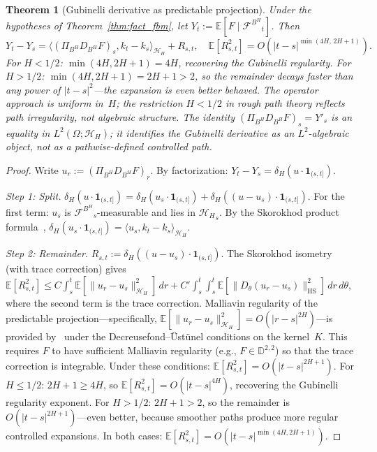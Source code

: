\documentclass[11pt,a4paper]{article}
\theoremstyle{plain}
\newtheorem{theorem}{Theorem}[section]
\theoremstyle{definition}
\theoremstyle{remark}
\newcommand{\E}{\mathbb{E}}
\newcommand{\HH}{\mathcal{H}_H}
\newcommand{\BH}{B^H}
\newcommand{\FBH}{\mathcal{F}^{B^H}}
\begin{document}
\begin{theorem}[Gubinelli derivative as predictable projection]\label{thm:gub}
Under the hypotheses of Theorem~\ref{thm:fact_fbm}, let $Y_t := \E[F\mid{\FBH}_t]$. Then
\begin{equation}\label{eq:gub}
Y_t - Y_s = \langle(\Pi_{\BH}D_{\BH}F)_s, k_t-k_s\rangle_{\HH} + R_{s,t}, \quad \E[R_{s,t}^2] = O(|t-s|^{\min(4H,\,2H+1)}).
\end{equation}
For $H < 1/2$: $\min(4H, 2H+1) = 4H$, recovering the Gubinelli regularity. For $H > 1/2$: $\min(4H, 2H+1) = 2H+1 > 2$, so the remainder decays faster than any power of $|t-s|^2$---the expansion is even better behaved. The operator approach is uniform in~$H$; the restriction $H < 1/2$ in rough path theory reflects path irregularity, not algebraic structure. The identity $(\Pi_{\BH}D_{\BH}F)_s = Y'_s$ is an equality in $L^2(\Omega; \HH)$; it identifies the Gubinelli derivative as an $L^2$-algebraic object, not as a pathwise-defined controlled path.
\end{theorem}

\begin{proof}
Write $u_r := (\Pi_{\BH}D_{\BH}F)_r$. By factorization: $Y_t-Y_s = \delta_H(u\cdot\mathbf{1}_{(s,t]})$.

\emph{Step 1: Split.} $\delta_H(u\cdot\mathbf{1}_{(s,t]}) = \delta_H(u_s\cdot\mathbf{1}_{(s,t]}) + \delta_H((u-u_s)\cdot\mathbf{1}_{(s,t]})$. For the first term: $u_s$ is ${\FBH}_s$-measurable and lies in ${\HH}_s$. By the Skorokhod product formula~\cite[Proposition 1.3.2]{Nualart2006}, $\delta_H(u_s\cdot\mathbf{1}_{(s,t]}) = \langle u_s, k_t-k_s\rangle_{\HH}$.

\emph{Step 2: Remainder.} $R_{s,t} := \delta_H((u-u_s)\cdot\mathbf{1}_{(s,t]})$. The Skorokhod isometry (with trace correction) gives $\E[R_{s,t}^2] \le C\int_s^t\E[\|u_r-u_s\|^2_{\HH}]\,dr + C'\int_s^t\int_s^t\E[\|D_\theta(u_r-u_s)\|^2_{\text{HS}}]\,dr\,d\theta$, where the second term is the trace correction. Malliavin regularity of the predictable projection---specifically, $\E[\|u_r-u_s\|^2_{\HH}] = O(|r-s|^{2H})$---is provided by~\cite[Section 5]{Decreusefond1999} under the Decreusefond--\"Ust\"unel conditions on the kernel~$K$. This requires $F$ to have sufficient Malliavin regularity (e.g., $F \in \mathbb{D}^{2,2}$) so that the trace correction is integrable. Under these conditions: $\E[R_{s,t}^2] = O(|t-s|^{2H+1})$. For $H \le 1/2$: $2H+1 \ge 4H$, so $\E[R_{s,t}^2] = O(|t-s|^{4H})$, recovering the Gubinelli regularity exponent. For $H > 1/2$: $2H+1 > 2$, so the remainder is $O(|t-s|^{2H+1})$---even better, because smoother paths produce more regular controlled expansions. In both cases: $\E[R_{s,t}^2] = O(|t-s|^{\min(4H,2H+1)})$.
\end{proof}
\end{document}

